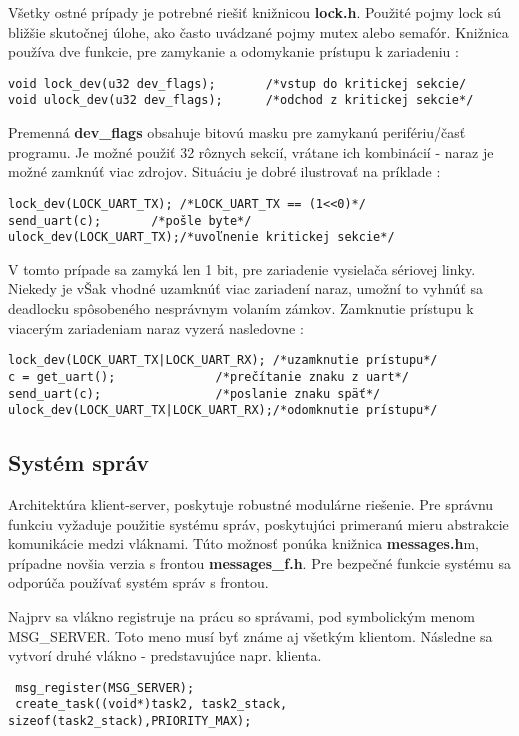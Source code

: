 Všetky ostné prípady je potrebné riešiť knižnicou \textbf{lock.h}. Použité pojmy lock sú bližšie skutočnej úlohe, ako často uvádzané pojmy mutex alebo semafór. Knižnica používa dve funkcie, pre zamykanie a odomykanie prístupu k zariadeniu :
{\small
\begin{verbatim}
void lock_dev(u32 dev_flags);		/*vstup do kritickej sekcie/
void ulock_dev(u32 dev_flags);		/*odchod z kritickej sekcie*/
\end{verbatim}
}
Premenná \textbf{dev\_flags} obsahuje bitovú masku pre zamykanú perifériu/časť programu. Je možné použiť 32 rôznych sekcií, vrátane ich kombinácií - naraz je možné zamknúť viac zdrojov. Situáciu je dobré ilustrovať na príklade :
{\small
\begin{verbatim}
lock_dev(LOCK_UART_TX); /*LOCK_UART_TX == (1<<0)*/
send_uart(c);		/*pošle byte*/
ulock_dev(LOCK_UART_TX);/*uvoľnenie kritickej sekcie*/
\end{verbatim}
}
V tomto prípade sa zamyká len 1 bit, pre zariadenie vysielača sériovej linky. Niekedy je vŠak vhodné uzamknúť viac zariadení naraz, umožní to vyhnúť sa deadlocku spôsobeného nesprávnym volaním zámkov. Zamknutie prístupu k viacerým zariadeniam naraz vyzerá nasledovne :
{\small
\begin{verbatim}
lock_dev(LOCK_UART_TX|LOCK_UART_RX); /*uzamknutie prístupu*/
c = get_uart();			     /*prečítanie znaku z uart*/
send_uart(c);			     /*poslanie znaku späť*/
ulock_dev(LOCK_UART_TX|LOCK_UART_RX);/*odomknutie prístupu*/
\end{verbatim}
}




\subsection{Systém správ}

Architektúra klient-server, poskytuje robustné modulárne riešenie. Pre správnu funkciu vyžaduje použitie systému správ, poskytujúci primeranú mieru abstrakcie komunikácie medzi vláknami. Túto možnosť ponúka knižnica \textbf{messages.h}m, prípadne novšia verzia s frontou \textbf{messages\_f.h}. Pre bezpečné funkcie systému sa odporúča používať systém správ s frontou. 

Najprv sa vlákno registruje na prácu so správami, pod symbolickým menom MSG\_SERVER. Toto meno musí byť známe aj všetkým klientom. Následne sa vytvorí druhé vlákno - predstavujúce napr. klienta.

{\small
\begin{verbatim}
 msg_register(MSG_SERVER);
 create_task((void*)task2, task2_stack, sizeof(task2_stack),PRIORITY_MAX);
\end{verbatim}
}


